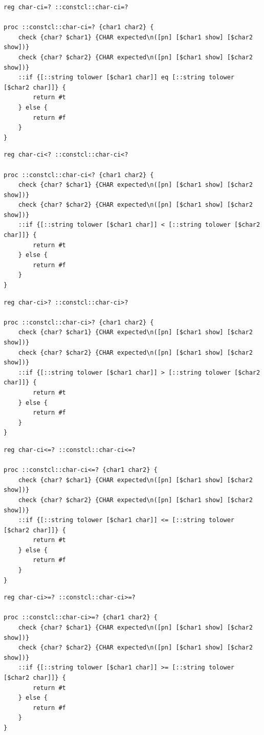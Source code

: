 \documentclass[twoside,9pt]{report}
\begin{document}
\noindent\makebox[\linewidth]{\rule{\linewidth}{0.4pt}}
\begin{lstlisting}
reg char-ci=? ::constcl::char-ci=?
 
proc ::constcl::char-ci=? {char1 char2} {
    check {char? $char1} {CHAR expected\n([pn] [$char1 show] [$char2 show])}
    check {char? $char2} {CHAR expected\n([pn] [$char1 show] [$char2 show])}
    ::if {[::string tolower [$char1 char]] eq [::string tolower [$char2 char]]} {
        return #t
    } else {
        return #f
    }
}
\end{lstlisting}
\noindent\makebox[\linewidth]{\rule{\linewidth}{0.4pt}}
\noindent\makebox[\linewidth]{\rule{\linewidth}{0.4pt}}
\begin{lstlisting}
reg char-ci<? ::constcl::char-ci<?
 
proc ::constcl::char-ci<? {char1 char2} {
    check {char? $char1} {CHAR expected\n([pn] [$char1 show] [$char2 show])}
    check {char? $char2} {CHAR expected\n([pn] [$char1 show] [$char2 show])}
    ::if {[::string tolower [$char1 char]] < [::string tolower [$char2 char]]} {
        return #t
    } else {
        return #f
    }
}
\end{lstlisting}
\noindent\makebox[\linewidth]{\rule{\linewidth}{0.4pt}}
\noindent\makebox[\linewidth]{\rule{\linewidth}{0.4pt}}
\begin{lstlisting}
reg char-ci>? ::constcl::char-ci>?
 
proc ::constcl::char-ci>? {char1 char2} {
    check {char? $char1} {CHAR expected\n([pn] [$char1 show] [$char2 show])}
    check {char? $char2} {CHAR expected\n([pn] [$char1 show] [$char2 show])}
    ::if {[::string tolower [$char1 char]] > [::string tolower [$char2 char]]} {
        return #t
    } else {
        return #f
    }
}
\end{lstlisting}
\noindent\makebox[\linewidth]{\rule{\linewidth}{0.4pt}}
\noindent\makebox[\linewidth]{\rule{\linewidth}{0.4pt}}
\begin{lstlisting}
reg char-ci<=? ::constcl::char-ci<=?
 
proc ::constcl::char-ci<=? {char1 char2} {
    check {char? $char1} {CHAR expected\n([pn] [$char1 show] [$char2 show])}
    check {char? $char2} {CHAR expected\n([pn] [$char1 show] [$char2 show])}
    ::if {[::string tolower [$char1 char]] <= [::string tolower [$char2 char]]} {
        return #t
    } else {
        return #f
    }
}
\end{lstlisting}
\noindent\makebox[\linewidth]{\rule{\linewidth}{0.4pt}}
\noindent\makebox[\linewidth]{\rule{\linewidth}{0.4pt}}
\begin{lstlisting}
reg char-ci>=? ::constcl::char-ci>=?
 
proc ::constcl::char-ci>=? {char1 char2} {
    check {char? $char1} {CHAR expected\n([pn] [$char1 show] [$char2 show])}
    check {char? $char2} {CHAR expected\n([pn] [$char1 show] [$char2 show])}
    ::if {[::string tolower [$char1 char]] >= [::string tolower [$char2 char]]} {
        return #t
    } else {
        return #f
    }
}
\end{lstlisting}
\noindent\makebox[\linewidth]{\rule{\linewidth}{0.4pt}}
\end{document}

